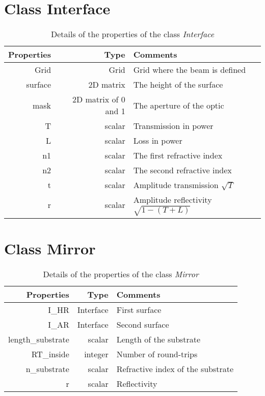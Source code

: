 \section{Class Interface}

\begin{table}
  \centering
  \caption{\label{App3:Inter} Details of the properties of the class \textsl{Interface} }
\begin{tabular}{|r r l|}
\hline
{\Large\strut} Properties & Type &  Comments \\
\hline
{\Large\strut} Grid &  Grid & Grid where the beam is defined \\
{\Large\strut} surface &  2D matrix & The height of the surface \\
{\Large\strut} mask &  2D matrix of 0 and 1 & The aperture of the optic \\
{\Large\strut} T &  scalar & Transmission in power \\
{\Large\strut} L &  scalar  & Loss in power \\
{\Large\strut} n1 &  scalar &  The first refractive index \\
{\Large\strut} n2 &  scalar &  The second refractive index \\
{\Large\strut} t &  scalar &  Amplitude transmission $\sqrt{T}$ \\
{\Large\strut} r &  scalar & Amplitude reflectivity $\sqrt{1-(T+L)}$ \\
\hline
\end{tabular}
\end{table}

\section{Class Mirror}

\begin{table}
  \centering
  \caption{\label{App3:Inter} Details of the properties of the class \textsl{Mirror} }
\begin{tabular}{|r r l|}
\hline
{\Large\strut} Properties & Type &  Comments \\
\hline
{\Large\strut} I\_HR &  Interface & First surface \\
{\Large\strut} I\_AR &  Interface & Second surface \\
{\Large\strut} length\_substrate & scalar & Length of the substrate \\
{\Large\strut} RT\_inside &  integer & Number of round-trips \\
{\Large\strut} n\_substrate &  scalar &  Refractive index of the substrate\\
{\Large\strut} r &  scalar & Reflectivity \\
\hline
\end{tabular}
\end{table}

